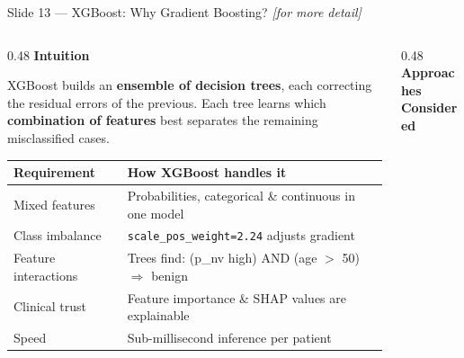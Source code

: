 \documentclass[aspectratio=169, 9pt]{beamer}
\begin{document}
\begin{frame}{Slide 13 --- XGBoost: Why Gradient Boosting? \hfill{\small\textit{[for more detail]}}}

  \begin{columns}[T]

    \begin{column}{0.48\textwidth}
      \textbf{\color{navyblue}Intuition}

      \vspace{0.3em}
      \small
      XGBoost builds an \textbf{ensemble of decision trees}, each correcting
      the residual errors of the previous.
      Each tree learns which \textbf{combination of features} best separates
      the remaining misclassified cases.

      \vspace{0.5em}
      {\small
      \begin{tabular}{@{} p{2.4cm} p{3.6cm} @{}}
        \toprule
        Requirement & How XGBoost handles it \\
        \midrule
        Mixed features
          & Probabilities, categorical \& continuous in one model \\
        \addlinespace
        Class imbalance
          & \texttt{scale\_pos\_weight=2.24} adjusts gradient \\
        \addlinespace
        Feature interactions
          & Trees find: (p\_nv high) AND (age $>$ 50) $\Rightarrow$ benign \\
        \addlinespace
        Clinical trust
          & Feature importance \& SHAP values are explainable \\
        \addlinespace
        Speed
          & Sub-millisecond inference per patient \\
        \bottomrule
      \end{tabular}
      }
    \end{column}

    \begin{column}{0.48\textwidth}
      \textbf{\color{navyblue}Approaches Considered}


\end{column}
\end{columns}
\end{frame}
\end{document}
